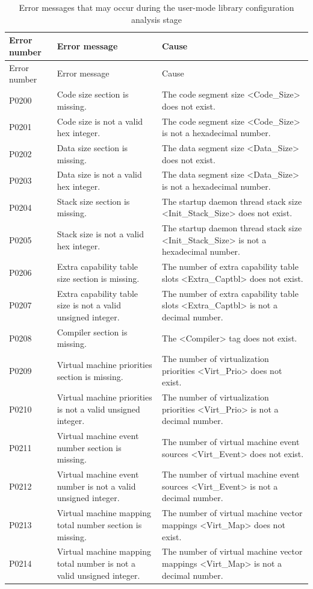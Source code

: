 \begin{xltabular}{\textwidth}{@{}>{\hsize\raggedright\arraybackslash}X>{\hsize\raggedright\arraybackslash}X>{\hsize\raggedright\arraybackslash}X@{}}
\caption{Error messages that may occur during the user-mode library configuration analysis stage}\label{tab:5-5}\\
\toprule
Error number & Error message & Cause\tabularnewline
\endfirsthead
\toprule
Error number & Error message & Cause\tabularnewline
\midrule
\endhead
\bottomrule
\endlastfoot
P0200 & Code size section is missing. &
The code segment size <Code\_\allowbreak{}Size> does not exist.\tabularnewline
P0201 & Code size is not a valid hex integer. &
The code segment size <Code\_\allowbreak{}Size> is not a hexadecimal number.\tabularnewline
P0202 & Data size section is missing. &
The data segment size <Data\_\allowbreak{}Size> does not exist.\tabularnewline
P0203 & Data size is not a valid hex integer. &
The data segment size <Data\_\allowbreak{}Size> is not a hexadecimal number.\tabularnewline
P0204 & Stack size section is missing. &
The startup daemon thread stack size <Init\_\allowbreak{}Stack\_\allowbreak{}Size> does not exist.\tabularnewline
P0205 & Stack size is not a valid hex integer. &
The startup daemon thread stack size <Init\_\allowbreak{}Stack\_\allowbreak{}Size> is not a hexadecimal number.\tabularnewline
P0206 & Extra capability table size section is missing. &
The number of extra capability table slots <Extra\_\allowbreak{}Captbl> does not exist.\tabularnewline
P0207 & Extra capability table size is not a valid unsigned integer. &
The number of extra capability table slots <Extra\_\allowbreak{}Captbl> is not a decimal number.\tabularnewline
P0208 & Compiler section is missing. &
The <Compiler> tag does not exist.\tabularnewline
P0209 & Virtual machine priorities section is missing. &
The number of virtualization priorities <Virt\_\allowbreak{}Prio> does not exist.\tabularnewline
P0210 & Virtual machine priorities is not a valid unsigned integer. &
The number of virtualization priorities <Virt\_\allowbreak{}Prio> is not a decimal number.\tabularnewline
P0211 & Virtual machine event number section is missing. &
The number of virtual machine event sources <Virt\_\allowbreak{}Event> does not exist.\tabularnewline
P0212 & Virtual machine event number is not a valid unsigned integer. &
The number of virtual machine event sources <Virt\_\allowbreak{}Event> is not a decimal number.\tabularnewline
P0213 & Virtual machine mapping total number section is missing. &
The number of virtual machine vector mappings <Virt\_\allowbreak{}Map> does not exist.\tabularnewline
P0214 & Virtual machine mapping total number is not a valid unsigned
integer. &
The number of virtual machine vector mappings <Virt\_\allowbreak{}Map> is not a decimal number.\tabularnewline
\end{xltabular}

